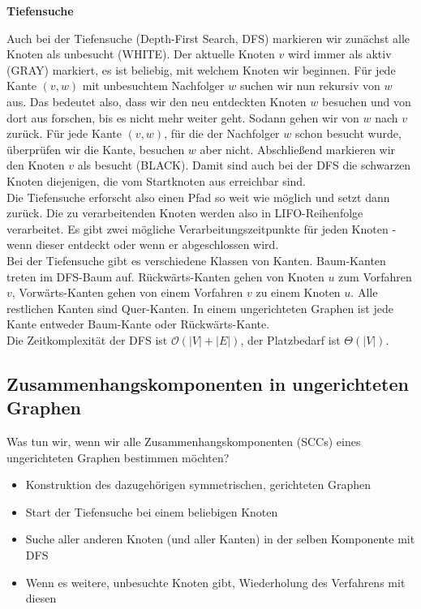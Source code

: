 \documentclass[12pt]{article}
\begin{document}
\textbf{Tiefensuche}

Auch bei der Tiefensuche (Depth-First Search, DFS) markieren wir zunächst alle Knoten als unbesucht (WHITE). Der aktuelle Knoten $v$ wird immer als aktiv (GRAY) markiert, es ist beliebig, mit welchem Knoten wir beginnen. Für jede Kante $(v, w)$ mit unbesuchtem Nachfolger $w$ suchen wir nun rekursiv von $w$ aus. Das bedeutet also, dass wir den neu entdeckten Knoten $w$ besuchen und von dort aus forschen, bis es nicht mehr weiter geht. Sodann gehen wir von $w$ nach $v$ zurück. Für jede Kante $(v, w)$, für die der Nachfolger $w$ schon besucht wurde, überprüfen wir die Kante, besuchen $w$ aber nicht. Abschließend markieren wir den Knoten $v$ als besucht (BLACK). Damit sind auch bei der DFS die schwarzen Knoten diejenigen, die vom Startknoten aus erreichbar sind.\\

Die Tiefensuche erforscht also einen Pfad so weit wie möglich und setzt dann zurück. Die zu verarbeitenden Knoten werden also in LIFO-Reihenfolge verarbeitet. Es gibt zwei mögliche Verarbeitungszeitpunkte für jeden Knoten - wenn dieser entdeckt oder wenn er abgeschlossen wird.\\

Bei der Tiefensuche gibt es verschiedene Klassen von Kanten. Baum-Kanten treten im DFS-Baum auf. Rückwärts-Kanten gehen von Knoten $u$ zum Vorfahren $v$, Vorwärts-Kanten gehen von einem Vorfahren $v$ zu einem Knoten $u$. Alle restlichen Kanten sind Quer-Kanten. In einem ungerichteten Graphen ist jede Kante entweder Baum-Kante oder Rückwärts-Kante.\\

Die Zeitkomplexität der DFS ist $\mathcal O(|V| + |E|)$, der Platzbedarf ist $\Theta(|V|)$.

\subsection{Zusammenhangskomponenten in ungerichteten Graphen}

Was tun wir, wenn wir alle Zusammenhangskomponenten (SCCs) eines ungerichteten Graphen bestimmen möchten?

\begin{itemize}
\item Konstruktion des dazugehörigen symmetrischen, gerichteten Graphen
\item Start der Tiefensuche bei einem beliebigen Knoten
\item Suche aller anderen Knoten (und aller Kanten) in der selben Komponente mit DFS
\item Wenn es weitere, unbesuchte Knoten gibt, Wiederholung des Verfahrens mit diesen
\end{itemize}
\end{document}
